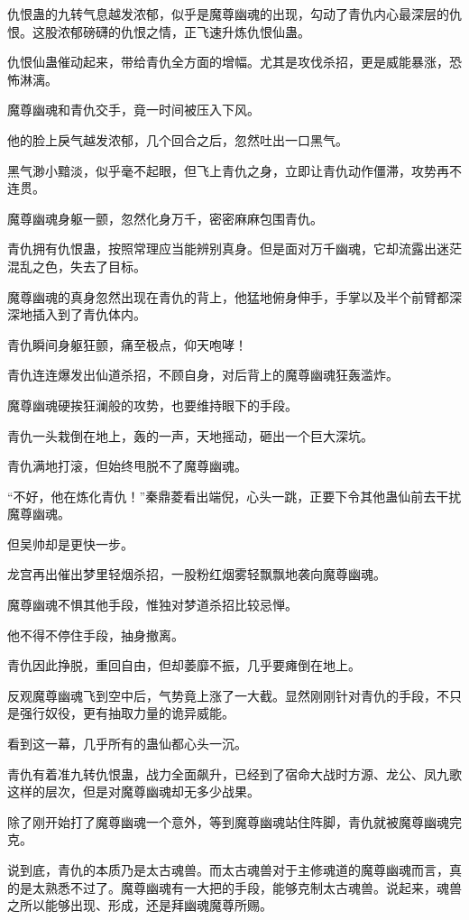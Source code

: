 \begin{this_body}
仇恨蛊的九转气息越发浓郁，似乎是魔尊幽魂的出现，勾动了青仇内心最深层的仇恨。这股浓郁磅礴的仇恨之情，正飞速升炼仇恨仙蛊。

仇恨仙蛊催动起来，带给青仇全方面的增幅。尤其是攻伐杀招，更是威能暴涨，恐怖淋漓。

魔尊幽魂和青仇交手，竟一时间被压入下风。

他的脸上戾气越发浓郁，几个回合之后，忽然吐出一口黑气。

黑气渺小黯淡，似乎毫不起眼，但飞上青仇之身，立即让青仇动作僵滞，攻势再不连贯。

魔尊幽魂身躯一颤，忽然化身万千，密密麻麻包围青仇。

青仇拥有仇恨蛊，按照常理应当能辨别真身。但是面对万千幽魂，它却流露出迷茫混乱之色，失去了目标。

魔尊幽魂的真身忽然出现在青仇的背上，他猛地俯身伸手，手掌以及半个前臂都深深地插入到了青仇体内。

青仇瞬间身躯狂颤，痛至极点，仰天咆哮！

青仇连连爆发出仙道杀招，不顾自身，对后背上的魔尊幽魂狂轰滥炸。

魔尊幽魂硬挨狂澜般的攻势，也要维持眼下的手段。

青仇一头栽倒在地上，轰的一声，天地摇动，砸出一个巨大深坑。

青仇满地打滚，但始终甩脱不了魔尊幽魂。

“不好，他在炼化青仇！”秦鼎菱看出端倪，心头一跳，正要下令其他蛊仙前去干扰魔尊幽魂。

但吴帅却是更快一步。

龙宫再出催出梦里轻烟杀招，一股粉红烟雾轻飘飘地袭向魔尊幽魂。

魔尊幽魂不惧其他手段，惟独对梦道杀招比较忌惮。

他不得不停住手段，抽身撤离。

青仇因此挣脱，重回自由，但却萎靡不振，几乎要瘫倒在地上。

反观魔尊幽魂飞到空中后，气势竟上涨了一大截。显然刚刚针对青仇的手段，不只是强行奴役，更有抽取力量的诡异威能。

看到这一幕，几乎所有的蛊仙都心头一沉。

青仇有着准九转仇恨蛊，战力全面飙升，已经到了宿命大战时方源、龙公、凤九歌这样的层次，但是对魔尊幽魂却无多少战果。

除了刚开始打了魔尊幽魂一个意外，等到魔尊幽魂站住阵脚，青仇就被魔尊幽魂完克。

说到底，青仇的本质乃是太古魂兽。而太古魂兽对于主修魂道的魔尊幽魂而言，真的是太熟悉不过了。魔尊幽魂有一大把的手段，能够克制太古魂兽。说起来，魂兽之所以能够出现、形成，还是拜幽魂魔尊所赐。


\end{this_body}
